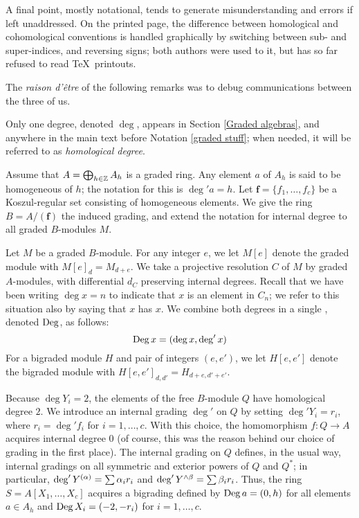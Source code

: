 A final point, mostly notational, tends to generate misunderstanding
and errors if left unaddressed.  On the printed page, the difference
between homological and cohomological conventions is handled
graphically by switching between sub- and super-indices, and reversing
signs; both authors were used to it, but \Mtwo has so far refused to
read \TeX\ printouts.

The {\sl raison d'\^etre\/} of the following remarks was to debug
communications between the three of us.

\begin{Remark}
\label{bigrading}
Only one degree, denoted $\deg$, appears in Section \ref{Graded
algebras}, and anywhere in the main text before Notation \ref{graded
stuff}; when needed, it will be referred to as {\it homological
degree\/}.

Assume that $A=\bigoplus_{h\in{\mathbb Z}}A_h$ is a graded ring.  Any element
$a$ of $A_h$ is said to be homogeneous of {\it{}\/}
$h$; the notation for this is $\deg' a=h$.  Let ${\boldsymbol f}=\{f_1,
\dots, f_c\}$ be a Koszul-regular set consisting of homogeneous
elements.  We give the ring $B=A/({\boldsymbol f})$ the induced
grading, and extend the notation for internal degree to all graded
$B$-modules $M$.

Let $M$ be a graded $B$-module.  For any integer $e$, we let $M[e]$
denote the graded module with $M[e]_d = M_{d+e}$.  We take a projective
resolution $C$ of $M$ by graded $A$-modules, with differential $d_C$
preserving internal degrees.  Recall that we have been writing $\deg x
= n$ to indicate that $x$ is an element in $C_n$; we refer to this
situation also by saying that $x$ has {\it{}}
$x$.  We combine both degrees in a single {\it{}}, denoted
$\operatorname{Deg}$, as follows:
\[
\operatorname{Deg} x = (\deg x, \deg' x)
\]
For a bigraded module $H$ and pair of integers $(e, e')$, we let
$H[e,e']$ denote the bigraded module with $H[e,e']_{d,d'} =
H_{d+e,d'+e'}$.

Because $\deg Y_i = 2$, the elements of the free $B$-module $Q$ have
homological degree $2$.  We introduce an internal grading $\deg'$ on
$Q$ by setting $\deg' Y_i = r_i$, where $r_i=\deg' f_i$ for
$i=1,\dots,c$.  With this choice, the homomorphism $f\colon Q\to A$
acquires internal degree $0$ (of course, this was the reason behind our
choice of grading in the first place).  The internal grading on $Q$
defines, in the usual way, internal gradings on all symmetric and
exterior powers of $Q$ and $Q^*$; in particular, $\deg'Y^{(\alpha)}=\sum
\alpha_i r_i$ and $\deg' Y^{\wedge\beta} = \sum \beta_i r_i$.  Thus, the ring
$S=A[X_1,\dots,X_c]$ acquires a bigrading defined by
$\operatorname{Deg} a=(0, h)$ for all elements $a\in A_h$ and $\operatorname{Deg} X_i=(-2,-r_i)$
for $i=1,\dots,c$.


\end{Remark}
